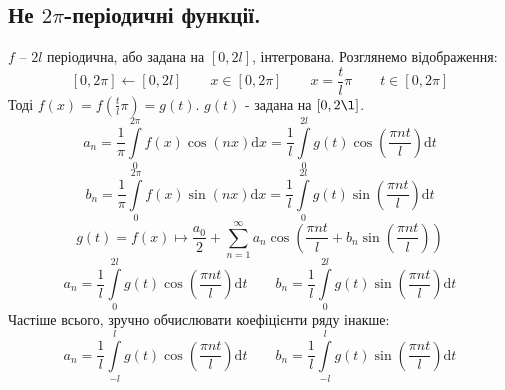 \documentclass[a4paper]{scrartcl}
\theoremstyle{definition}
\theoremstyle{remark}
\theoremstyle{definition}
\theoremstyle{definition}
\begin{document}
\subsection{Не $2\pi$-періодичні функції.}
$f$  -- $2l$ періодична, або задана на $[0, 2l]$, інтегрована. Розглянемо відображення:
$$
[0, 2\pi] \leftarrow [0, 2l] \qquad x \in [0, 2\pi] \qquad x = \frac{t}{l}\pi \qquad t\in [0, 2\pi]
$$
Тоді $f(x) = f( \frac{t}{l}\pi ) = g(t)$. $g(t)$ - задана на $[0, 2\l]$.
$$
a_n = \frac{1}{\pi}  \int\limits_{0}^{2\pi}{ f(x) \cos{(nx)} \mathrm{d} x } =   \frac{1
}{l }  \int\limits_{0}^{2l}{ g(t) \cos{ \left( \frac{\pi n t}{l}  \right)} \mathrm{d} t}
$$
$$
b_n = \frac{1}{\pi}  \int\limits_{0}^{2\pi}{ f(x) \sin{(nx)} \mathrm{d} x } =   \frac{1
}{l }  \int\limits_{0}^{2l}{ g(t) \sin{ \left( \frac{\pi n t}{l}  \right)} \mathrm{d} t}
$$
$$
g(t) = f(x) \mapsto \frac{a_0}{2} +  \sum\limits_{n = 1}^{ \infty}{a_n \cos{ \left(  \frac{\pi n t}{l} + b_n\sin{ \left( \frac{\pi n t}{l}  \right)}   \right)}}
$$
$$
a_n =\frac{1
}{l }  \int\limits_{0}^{2l}{ g(t) \cos{ \left( \frac{\pi n t}{l}  \right)} \mathrm{d} t}
 \qquad b_n = \frac{1
}{l }  \int\limits_{0}^{2l}{ g(t) \sin{ \left( \frac{\pi n t}{l}  \right)} \mathrm{d} t}
$$
Частіше всього, зручно обчислювати коефіцієнти ряду інакше:
$$
a_n =\frac{1
}{l }  \int\limits_{-l}^{l}{ g(t) \cos{ \left( \frac{\pi n t}{l}  \right)} \mathrm{d} t}
 \qquad b_n = \frac{1
}{l }  \int\limits_{-l}^{l}{ g(t) \sin{ \left( \frac{\pi n t}{l}  \right)} \mathrm{d} t}
$$
\newpage
\end{document}
